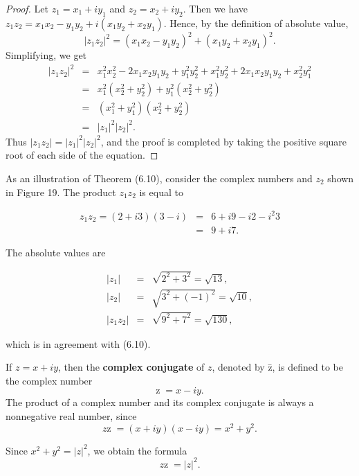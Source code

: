 \begin{proof}
Let $z_{1} = x_{1} + iy_{1}$ and $z_{2} = x_{2} + iy_{2}$. Then we have 
$z_{1}z_{2} = x_{1}x_{2} - y_{1}y_{2} + i(x_{1}y_{2} + x_{2}y_{1})$. 
Hence, by the definition of absolute value,
$$
|z_{1}z_{2}|^{2} = (x_{1}x_{2} - y_{1}y_{2})^2 + (x_{1}y_{2} + x_{2}y_{1})^2.
$$
Simplifying, we get
\begin{eqnarray*}
|z_{1}z_{2}|^2 &=& x_{1}^{2} x_{2}^{2} - 2x_{1}x_{2}y_{1}y_{2} + y_{1}^{2}y_{2}^{2} 
+ x_{1}^{2}y_{2}^{2} + 2x_{1}x_{2}y_{1}y_{2} + x_{2}^{2}y_{1}^{2} \\
                       &=& x_{1}^{2}(x_{2}^{2} + y_{2}^{2}) + y_{1}^{2}(x_{2}^{2} + y_{2}^{2})\\
                       &=& (x_{1}^{2} + y_{1}^{2})(x_{2}^{2} + y_{2}^{2})\\
                       &=&  |z_{1}|^{2} |z_{2}|^{2}.
\end{eqnarray*}
Thus $|z_{1}z_{2}| = |z_{1}|^{2} |z_{2}|^{2}$, and the proof is completed by taking 
the positive square root of each side of the equation.
\end{proof}

As an illustration of Theorem (6.10), consider the complex numbers and $z_{2}$ shown 
in Figure 19. The product $z_{1}z_{2}$ is equal to

\begin{eqnarray*}
z_{1}z_{2} = (2 + i3)(3 - i) &=& 6 + i9 - i2 - i^{2} 3\\
                                         &=& 9 + i7. 
\end{eqnarray*}

\noindent The absolute values are 

\begin{eqnarray*}
        |z_{1}| &=& \sqrt{2^{2} + 3^{2}} = \sqrt{13}, \\
        |z_{2}| &=& \sqrt{3^{2} + (- 1)^{2}} = \sqrt{10},\\
|z_{1}z_{2}| &=& \sqrt{9^2 + 7^{2}} = \sqrt{130},
\end{eqnarray*}

\noindent which is in agreement with (6.10).

If $z = x + iy$, then the \textbf{complex conjugate} of $z$, denoted by \={z}, 
is defined to be the complex number
$$
\mbox{\={z}}\; = x- iy.
$$
\noindent The product of a complex number and its complex conjugate is always a nonnegative real
number, since 
$$
z \mbox{\={z}}\; = (x + iy)(x - iy) = x^2 + y^2. 
$$

\noindent Since $x^2 + y^2 = |z|^2$, we obtain the formula
$$
z \mbox{\={z}}\; = |z|^2.
$$

